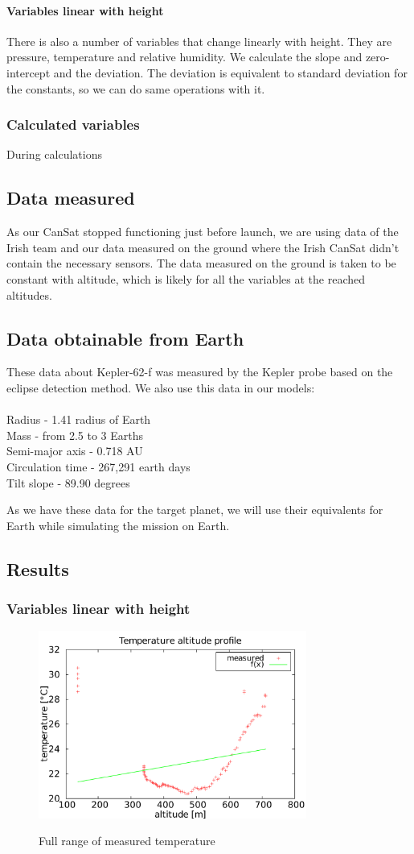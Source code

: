 \documentclass{cfp}
\begin{document}
\paragraph{Variables linear with height} There is also a number of variables that change linearly with height. They are pressure, temperature and relative humidity. We calculate the slope and zero-intercept and the deviation. The deviation is equivalent to standard deviation for the constants, so we can do same operations with it.
\subsubsection{Calculated variables}
During calculations 
\subsection{Data measured}
As our CanSat stopped functioning just before launch, we are using data of the Irish team and our data measured on the ground where the Irish CanSat didn't contain the necessary sensors. The data measured on the ground is taken to be constant with altitude, which is likely for all the variables at the reached altitudes.
\subsection{Data obtainable from Earth}
\par These data about Kepler-62-f was measured by the Kepler probe based on the eclipse detection method. We also use this data in our models: \\\\
Radius - 1.41 radius of Earth\\
Mass - from 2.5 to 3 Earths\\
Semi-major axis - 0.718 AU\\
Circulation time - 267,291 earth days\\
Tilt slope - 89.90 degrees
\par
As we have these data for the target planet, we will use their equivalents for Earth while simulating the mission on Earth.
\subsection{Results}
\subsubsection{Variables linear with height}
\begin{figure}[!h]
\centering
\caption{Full range of measured temperature}
\includegraphics[width=250pt]{temp_before.pdf}
\label{temp1}
\end{figure}
\end{document}
